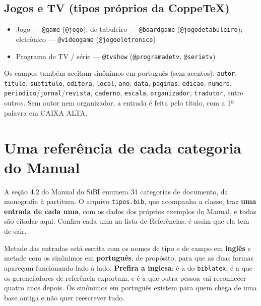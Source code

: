 \documentclass[dsc,pdfa]{coppe}
\begin{document}
  \subsection{Jogos e TV (tipos próprios da CoppeTeX)}
  \begin{itemize}
    \item Jogo --- \verb|@game| (\verb|@jogo|); de tabuleiro --- \verb|@boardgame| (\verb|@jogodetabuleiro|); eletrônico --- \verb|@videogame| (\verb|@jogoeletronico|)
    \item Programa de TV / série --- \verb|@tvshow| (\verb|@programadetv|, \verb|@serietv|)
  \end{itemize}

  Os campos também aceitam sinônimos em português (sem acentos): \verb|autor|, \verb|titulo|, \verb|subtitulo|, \verb|editora|, \verb|local|, \verb|ano|, \verb|data|, \verb|paginas|, \verb|edicao|, \verb|numero|, \verb|periodico|/\verb|jornal|/\verb|revista|, \verb|caderno|, \verb|escala|, \verb|organizador|, \verb|tradutor|, entre outros. Sem autor nem organizador, a entrada é feita pelo título, com a 1ª palavra em CAIXA ALTA.
  \par\endgroup

  \section{Uma referência de cada categoria do Manual}\label{sec:todosostipos}

  A seção 4.2 do Manual do SiBI enumera 34 categorias de documento, da monografia à partitura. O arquivo \verb|tipos.bib|, que acompanha a classe, traz \textbf{uma entrada de cada uma}, com os dados dos próprios exemplos do Manual, e todas são citadas aqui. Confira cada uma na lista de Referências: é assim que ela tem de sair.

  Metade das entradas está escrita com os nomes de tipo e de campo em \textbf{inglês} e metade com os sinônimos em \textbf{português}, de propósito, para que as duas formas apareçam funcionando lado a lado. \textbf{Prefira a inglesa}: é a do \texttt{biblatex}, é a que os gerenciadores de referência exportam, e é a que outra pessoa vai reconhecer quatro anos depois. Os sinônimos em português existem para quem chega de uma base antiga e não quer reescrever tudo.
\end{document}
